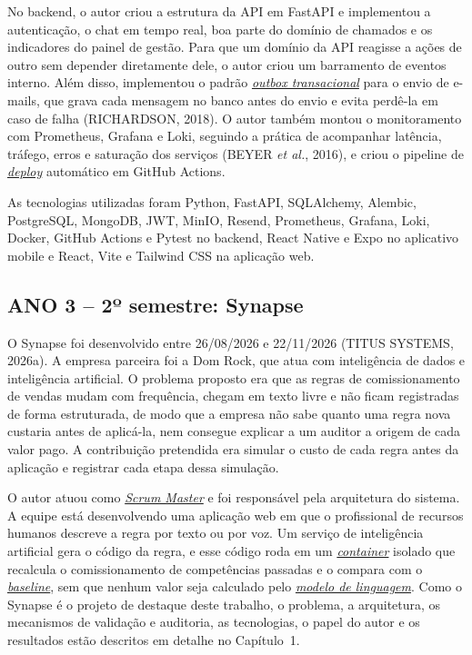 \documentclass[12pt,a4paper]{article}
\newcommand{\termo}[2]{\hyperlink{gls:#1}{\textit{#2}}}
\begin{document}
No backend, o autor criou a estrutura da API em FastAPI e implementou a autenticação, o chat em tempo real, boa parte do domínio de chamados e os indicadores do painel de gestão. Para que um domínio da API reagisse a ações de outro sem depender diretamente dele, o autor criou um barramento de eventos interno. Além disso, implementou o padrão \termo{outbox}{outbox transacional} para o envio de e-mails, que grava cada mensagem no banco antes do envio e evita perdê-la em caso de falha (RICHARDSON, 2018). O autor também montou o monitoramento com Prometheus, Grafana e Loki, seguindo a prática de acompanhar latência, tráfego, erros e saturação dos serviços (BEYER \textit{et al.}, 2016), e criou o pipeline de \termo{deploy}{deploy} automático em GitHub Actions.

As tecnologias utilizadas foram Python, FastAPI, SQLAlchemy, Alembic, PostgreSQL, MongoDB, JWT, MinIO, Resend, Prometheus, Grafana, Loki, Docker, GitHub Actions e Pytest no backend, React Native e Expo no aplicativo mobile e React, Vite e Tailwind CSS na aplicação web.

\subsection{ANO 3 – 2º semestre: Synapse}

O Synapse foi desenvolvido entre 26/08/2026 e 22/11/2026 (TITUS SYSTEMS, 2026a). A empresa parceira foi a Dom Rock, que atua com inteligência de dados e inteligência artificial. O problema proposto era que as regras de comissionamento de vendas mudam com frequência, chegam em texto livre e não ficam registradas de forma estruturada, de modo que a empresa não sabe quanto uma regra nova custaria antes de aplicá-la, nem consegue explicar a um auditor a origem de cada valor pago. A contribuição pretendida era simular o custo de cada regra antes da aplicação e registrar cada etapa dessa simulação.

O autor atuou como \termo{sm}{Scrum Master} e foi responsável pela arquitetura do sistema. A equipe está desenvolvendo uma aplicação web em que o profissional de recursos humanos descreve a regra por texto ou por voz. Um serviço de inteligência artificial gera o código da regra, e esse código roda em um \termo{container}{container} isolado que recalcula o comissionamento de competências passadas e o compara com o \termo{baseline}{baseline}, sem que nenhum valor seja calculado pelo \termo{modelo}{modelo de linguagem}. Como o Synapse é o projeto de destaque deste trabalho, o problema, a arquitetura, os mecanismos de validação e auditoria, as tecnologias, o papel do autor e os resultados estão descritos em detalhe no Capítulo~1.
\end{document}
